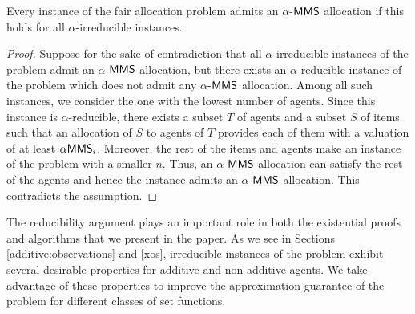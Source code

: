 \begin{observation}\label{reducibility}
	Every instance of the fair allocation problem admits an $\alpha$-$\mathsf{MMS}$ allocation if this holds for all $\alpha$-irreducible instances. 
\end{observation}
\begin{proof}
	Suppose for the sake of contradiction that all $\alpha$-irreducible instances of the problem admit an $\alpha$-$\mathsf{MMS}$ allocation, but there exists an $\alpha$-reducible instance of the problem which does not admit any $\alpha$-$\mathsf{MMS}$ allocation. Among all such instances, we consider the one with the lowest number of agents. Since this instance is $\alpha$-reducible, there exists a subset $T$ of agents and a subset $S$ of items such that an allocation of $S$ to agents of $T$ provides each of them with a valuation of at least $\alpha \mathsf{MMS}_i$. Moreover, the rest of the items and agents make an instance of the problem with a smaller $n$. Thus, an $\alpha$-$\mathsf{MMS}$ allocation can satisfy the rest of the agents and hence the instance admits an $\alpha$-$\mathsf{MMS}$ allocation. This contradicts the assumption. 
\end{proof}

The reducibility argument plays an important role in both the existential proofs and algorithms that we present in the paper. As we see in Sections \ref{additive:observations} and \ref{xos}, irreducible instances of the problem exhibit several desirable properties for additive and non-additive agents. We take advantage of these properties to improve the approximation guarantee of the problem for different classes of set functions.
